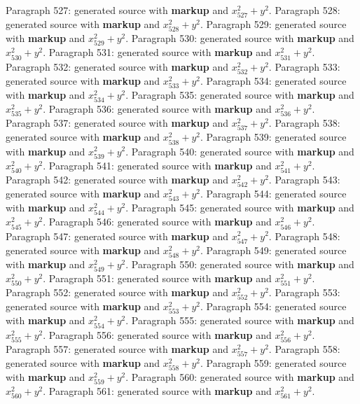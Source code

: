 \documentclass{article}
\begin{document}
Paragraph 527: generated source with \textbf{markup} and $x_{527}^2 + y^2$.
Paragraph 528: generated source with \textbf{markup} and $x_{528}^2 + y^2$.
Paragraph 529: generated source with \textbf{markup} and $x_{529}^2 + y^2$.
Paragraph 530: generated source with \textbf{markup} and $x_{530}^2 + y^2$.
Paragraph 531: generated source with \textbf{markup} and $x_{531}^2 + y^2$.
Paragraph 532: generated source with \textbf{markup} and $x_{532}^2 + y^2$.
Paragraph 533: generated source with \textbf{markup} and $x_{533}^2 + y^2$.
Paragraph 534: generated source with \textbf{markup} and $x_{534}^2 + y^2$.
Paragraph 535: generated source with \textbf{markup} and $x_{535}^2 + y^2$.
Paragraph 536: generated source with \textbf{markup} and $x_{536}^2 + y^2$.
Paragraph 537: generated source with \textbf{markup} and $x_{537}^2 + y^2$.
Paragraph 538: generated source with \textbf{markup} and $x_{538}^2 + y^2$.
Paragraph 539: generated source with \textbf{markup} and $x_{539}^2 + y^2$.
Paragraph 540: generated source with \textbf{markup} and $x_{540}^2 + y^2$.
Paragraph 541: generated source with \textbf{markup} and $x_{541}^2 + y^2$.
Paragraph 542: generated source with \textbf{markup} and $x_{542}^2 + y^2$.
Paragraph 543: generated source with \textbf{markup} and $x_{543}^2 + y^2$.
Paragraph 544: generated source with \textbf{markup} and $x_{544}^2 + y^2$.
Paragraph 545: generated source with \textbf{markup} and $x_{545}^2 + y^2$.
Paragraph 546: generated source with \textbf{markup} and $x_{546}^2 + y^2$.
Paragraph 547: generated source with \textbf{markup} and $x_{547}^2 + y^2$.
Paragraph 548: generated source with \textbf{markup} and $x_{548}^2 + y^2$.
Paragraph 549: generated source with \textbf{markup} and $x_{549}^2 + y^2$.
Paragraph 550: generated source with \textbf{markup} and $x_{550}^2 + y^2$.
Paragraph 551: generated source with \textbf{markup} and $x_{551}^2 + y^2$.
Paragraph 552: generated source with \textbf{markup} and $x_{552}^2 + y^2$.
Paragraph 553: generated source with \textbf{markup} and $x_{553}^2 + y^2$.
Paragraph 554: generated source with \textbf{markup} and $x_{554}^2 + y^2$.
Paragraph 555: generated source with \textbf{markup} and $x_{555}^2 + y^2$.
Paragraph 556: generated source with \textbf{markup} and $x_{556}^2 + y^2$.
Paragraph 557: generated source with \textbf{markup} and $x_{557}^2 + y^2$.
Paragraph 558: generated source with \textbf{markup} and $x_{558}^2 + y^2$.
Paragraph 559: generated source with \textbf{markup} and $x_{559}^2 + y^2$.
Paragraph 560: generated source with \textbf{markup} and $x_{560}^2 + y^2$.
Paragraph 561: generated source with \textbf{markup} and $x_{561}^2 + y^2$.
\end{document}
